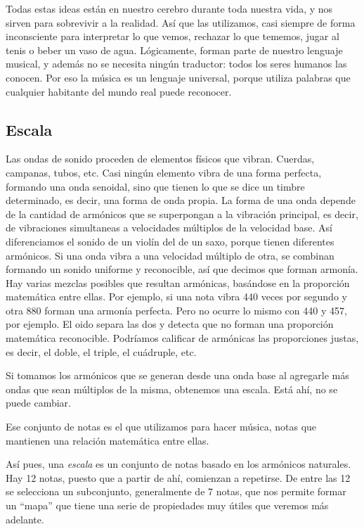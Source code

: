 \documentclass[]{article}
\begin{document}
Todas estas ideas están en nuestro cerebro durante toda nuestra vida, y nos sirven para sobrevivir a la realidad. Así que las         utilizamos, casi siempre de forma inconsciente para interpretar lo que         vemos, rechazar lo que tememos, jugar al tenis o beber un vaso de         agua. Lógicamente, forman parte de nuestro lenguaje musical, y además         no se necesita ningún traductor: todos los seres humanos las conocen.         Por eso la música es un lenguaje universal, porque utiliza palabras         que cualquier habitante del mundo real puede reconocer.

\subsection{Escala}

Las ondas de sonido proceden de elementos físicos que vibran. Cuerdas, campanas, tubos, etc. Casi ningún elemento vibra de una forma perfecta, formando una onda senoidal, sino que tienen lo que se dice un timbre determinado, es decir, una forma de onda propia. La forma de una onda depende de la cantidad de armónicos que se superpongan a la vibración principal, es decir, de vibraciones simultaneas a velocidades múltiplos de la velocidad base. Así diferenciamos el sonido de un violín del de un saxo, porque tienen diferentes armónicos. Si una onda vibra a una velocidad múltiplo de otra, se combinan formando un sonido uniforme y reconocible, así que decimos que forman armonía. Hay varias mezclas posibles que resultan armónicas, basándose en la proporción matemática entre ellas. Por ejemplo, si una nota vibra 440 veces por segundo y otra 880 forman una armonía perfecta. Pero no ocurre lo mismo con 440 y 457, por ejemplo. El oido separa las dos y detecta que no forman una proporción matemática reconocible. Podríamos calificar de armónicas las proporciones justas, es decir, el doble, el triple, el cuádruple, etc.

Si tomamos los armónicos que se generan desde una onda base al agregarle más ondas que sean múltiplos de la misma, obtenemos una escala. Está ahí, no se puede cambiar.

Ese conjunto de notas es el que utilizamos para hacer música, notas que mantienen una relación matemática entre ellas.

Así pues, una \emph{escala} es un conjunto de notas basado en los armónicos naturales. Hay 12 notas, puesto que a partir de ahí, comienzan a repetirse. De entre las 12 se selecciona un subconjunto, generalmente de 7 notas, que nos permite formar un ``mapa'' que tiene una serie de propiedades muy útiles que veremos más adelante.
\end{document}
